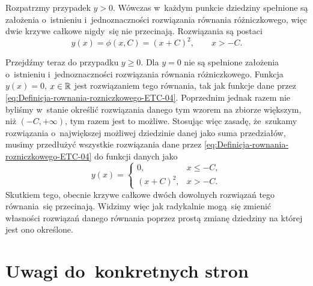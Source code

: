 \documentclass[a4paper,11pt]{article}
\numberwithin{equation}{section}
\begin{document}
Rozpatrzmy przypadek $y > 0$. Wówczas w~każdym punkcie dziedziny spełnione
są założenia o~istnieniu i~jednoznaczności rozwiązania równania
różniczkowego, więc dwie krzywe całkowe nigdy~się nie przecinają.
Rozwiązania są postaci
\begin{equation}
  \label{eq:Definicja-rownania-rozniczkowego-ETC-04}
  y( x ) = \phi( x, C ) = ( x + C )^{ 2 }, \qquad
  x > -C.
\end{equation}

Przejdźmy teraz do przypadku $y \geq 0$. Dla $y = 0$ nie są spełnione
założenia o~istnieniu i~jednoznaczności rozwiązania równania różniczkowego.
Funkcja $y( x ) = 0$, $x \in \mathbb{R}$ jest rozwiązaniem tego równania, tak jak
funkcje dane przez \eqref{eq:Definicja-rownania-rozniczkowego-ETC-04}.
Poprzednim jednak razem nie byliśmy w~stanie określić rozwiązania danego
tym wzorem na zbiorze większym, niż $( -C, +\infty )$, tym razem jest to możliwe.
Stosując więc zasadę, że~szukamy rozwiązania o~największej możliwej
dziedzinie danej jako suma przedziałów, musimy przedłużyć wszystkie
rozwiązania dane przez \eqref{eq:Definicja-rownania-rozniczkowego-ETC-04}
do funkcji danych jako
\begin{equation}
  \label{eq:Definicja-rownania-rozniczkowego-ETC-05}
  y( x ) =
  \begin{cases}
    0, & x \leq -C, \\
    ( x + C )^{ 2 }, & x > -C.
  \end{cases}
\end{equation}
Skutkiem tego, obecnie krzywe całkowe dwóch dowolnych rozwiązań tego
równania~się przecinają. Widzimy więc jak radykalnie mogą~się zmienić
własności rozwiązań danego równania poprzez prostą zmianę dziedziny na
której jest ono określone.














\section{Uwagi do~konkretnych stron}

\label{sec:Uwagi-do-konkrentych-stron}



\VerSpaceFour
\end{document}
